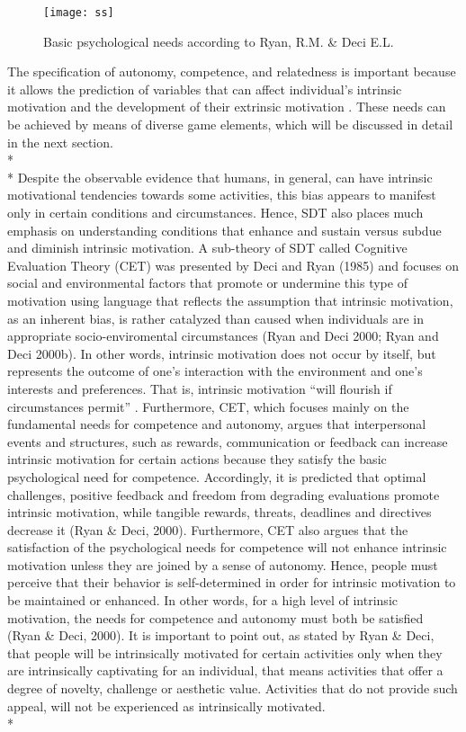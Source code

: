 \begin{figure}[h]
    \centering
    \texttt{[image: ss]}
    \caption{Basic psychological needs according to Ryan, R.M. \& Deci E.L. \cite{deci1994promoting} }
    \label{fig:ss}
\end{figure}
The specification of autonomy, competence, and relatedness is important because it allows the prediction of variables that can affect individual's intrinsic motivation and the development of their extrinsic motivation \cite{deci1994promoting}. These needs can be achieved by means of diverse game elements, which will be discussed in detail in the next section.\\*\\*
Despite the observable evidence that humans, in general, can have intrinsic motivational tendencies towards some activities, this bias appears to manifest only in certain conditions and circumstances. Hence, SDT also places much emphasis on understanding conditions that enhance and sustain versus subdue and diminish intrinsic motivation.  A sub-theory of SDT called Cognitive Evaluation Theory (CET) was presented by Deci and Ryan (1985) and focuses on social and environmental factors that promote or undermine this type of motivation using language that reflects the assumption that intrinsic motivation, as an inherent bias, is rather catalyzed than caused when individuals are in appropriate socio-enviromental circumstances (Ryan  and  Deci  2000;  Ryan and Deci 2000b). In other words, intrinsic motivation does not occur by itself, but represents the outcome of one's interaction with the environment and one's interests and preferences. That is, intrinsic motivation ``will flourish if circumstances permit'' \cite{ryan2000self}. Furthermore, CET, which focuses mainly on the fundamental needs for competence and autonomy, argues that interpersonal events and structures, such as rewards, communication or feedback can increase intrinsic motivation for certain actions because they satisfy the basic psychological need for competence. Accordingly, it is predicted that optimal challenges, positive feedback and freedom from degrading evaluations promote intrinsic motivation, while tangible rewards, threats,  deadlines  and  directives decrease it (Ryan \& Deci, 2000). Furthermore, CET also argues that the satisfaction of the psychological needs for competence will not enhance intrinsic motivation unless they are joined by a sense of autonomy. Hence, people must perceive that their behavior is self-determined in order for intrinsic motivation to be maintained or enhanced. In other words, for a high level of intrinsic motivation, the needs for competence and autonomy must both be satisfied (Ryan \& Deci, 2000). It is important to point out, as stated by Ryan \& Deci, that people will be intrinsically motivated for certain activities only when they are intrinsically captivating for an individual, that means activities that offer a degree of novelty, challenge or aesthetic value. Activities that do not provide such appeal, will not be experienced as intrinsically motivated. \\*
